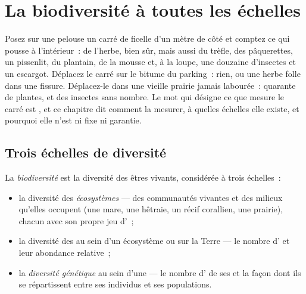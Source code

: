 \chapter{La biodiversité à toutes les échelles}\label{ch:g10:biodiversity-scales}

Posez sur une pelouse un carré de ficelle d'un mètre de côté et
comptez ce qui pousse à l'intérieur~: de l'herbe, bien sûr, mais aussi
du trèfle, des pâquerettes, un pissenlit, du plantain, de la mousse
et, à la loupe, une douzaine d'insectes et un escargot. Déplacez le
carré sur le bitume du parking~: rien, ou une herbe folle dans une
fissure. Déplacez-le dans une vieille prairie jamais labourée~:
quarante  de plantes, et des insectes sans nombre. Le mot qui
désigne ce que mesure le carré est \emph{}, et ce chapitre
dit comment la mesurer, à quelles échelles elle existe, et pourquoi
elle n'est ni fixe ni garantie.

\section{Trois échelles de diversité}

\begin{definition}[Biodiversité]\label{def:g10:biodiversity-scales:biodiversity}
La \emph{biodiversité} est la diversité des êtres
vivants, considérée à trois échelles~:
\begin{itemize}
  \item la diversité des \emph{écosystèmes} --- des
        communautés vivantes et des milieux qu'elles occupent (une
        mare, une hêtraie, un récif corallien, une prairie), chacun
        avec son propre jeu d'~;
  \item la diversité des  au sein d'un
        écosystème ou sur la Terre --- le nombre d' et leur
        abondance relative~;
  \item la \emph{diversité génétique} au
        sein d'une  --- le nombre d' de ses  et la
        façon dont ils se répartissent entre ses individus et ses
        populations.
\end{itemize}
\end{definition}

